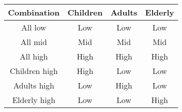 \begin{tabular}[t]{cccc}
\toprule
\multicolumn{1}{c}{Combination} & Children & Adults & Elderly \\
\midrule
All low     & Low   & Low   & Low \\
All mid     & Mid   & Mid   & Mid \\
All high     & High  & High  & High \\
Children high     & High   & Low  & Low \\
Adults high     & Low  & High   & Low \\
Elderly high     & Low   & Low   & High \\
\bottomrule
\end{tabular}%
